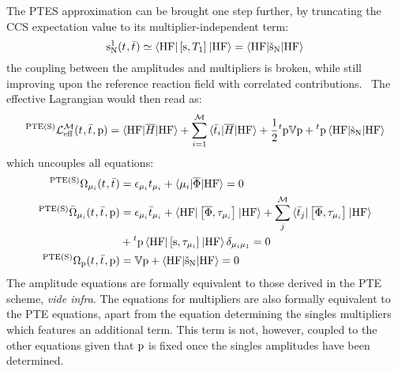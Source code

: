 The \acs{PTES} approximation can be brought one step further, by
truncating the \acs{CCS} expectation value to its multiplier-independent
term:
\begin{equation}
  \mathrm{s}_{\mathrm{N}}^1(t_{}, \bar{t}_{})
  \simeq
  \braket{\mathrm{HF} | \left[ \mathrm{s}, T_1 \right]^{} | \mathrm{HF}}
  =
  \braket{\mathrm{HF} | \check{\mathrm{s}}_{\mathrm{N}} | \mathrm{HF}}
\end{equation}
the coupling between the amplitudes and multipliers is broken, while
still improving upon the reference reaction field with correlated
contributions.~\autocite{Caricato2011-tx}
The effective Lagrangian would then read as:
\begin{equation}\label{eq:pte-s-cc}
  {}^{\mathrm{PTE(S)}}\mathcal{L}^\mathcal{M}_\mathrm{eff}(t_{}, \bar{t}_{}, \mathrm{p}) =
  \braket{\mathrm{HF} | \overline{H} | \mathrm{HF}}
  + \sum_{i=1}^{\mathcal{M}}\braket{\bar{t}_{i} | \overline{H} | \mathrm{HF}}
  + \frac{1}{2}{}^t\mathrm{p}\mathbb{V}\mathrm{p} + {}^t\mathrm{p}\braket{\mathrm{HF} | \check{\mathrm{s}}_{\mathrm{N}} | \mathrm{HF}}
\end{equation}
which uncouples all equations:
\begin{subequations}
  \begin{align}
  {}^{\mathrm{PTE(S)}}\Omega_{\mu_i}(t_{}, \bar{t}_{})  &=
   \epsilon_{\mu_i}t_{\mu_i} + \braket{\mu_i | \overline{\Phi} | \mathrm{HF}}
   = 0 \\
   {}^{\mathrm{PTE(S)}}\bar{\Omega}_{\mu_i}(t_{}, \bar{t}_{}, \mathrm{p}) &=
    \epsilon_{\mu_i}\bar{t}_{\mu_i} +
    \braket{\mathrm{HF} | \left[ \overline{\Phi}, \tau_{\mu_i} \right]^{} | \mathrm{HF}} +
    \sum_{j}^{\mathcal{M}}\braket{\bar{t}_{j} |
    \left[ \overline{\Phi}, \tau_{\mu_i} \right]^{} | \mathrm{HF}}
    \nonumber \\
    &+
    {}^t\mathrm{p}\braket{\mathrm{HF} | \left[ \mathrm{s}, \tau_{\mu_i} \right]^{} | \mathrm{HF}}\delta_{\mu_i\mu_1}
    = 0 \\
    {}^{\mathrm{PTE(S)}}\Omega_{\mathrm{p}}(t_{}, \bar{t}_{}, \mathrm{p})
    &=
    \mathbb{V}\mathrm{p} + \braket{\mathrm{HF} | \check{\mathrm{s}}_{\mathrm{N}} | \mathrm{HF}} = 0
  \end{align}
\end{subequations}
The amplitude equations are formally equivalent to those derived in the
\acs{PTE} scheme, \emph{vide infra}. The equations for multipliers are also formally
equivalent to the \acs{PTE} equations, apart from the equation
determining the singles multipliers which features an additional term.
This term is not, however, coupled to the other equations given that
$\mathrm{p}$ is fixed once the singles amplitudes have been determined.

